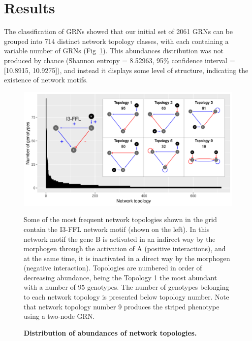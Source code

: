 \documentclass[10pt,letterpaper]{article}
\begin{document}


\section*{Results}

The classification of GRNs showed that our initial set of 2061 GRNs can be
grouped into 714 distinct network topology classes, with each containing a
variable number of GRNs (Fig~\ref{fig:distopol}). This abundances
distribution was not produced by chance (Shannon entropy = 8.52963, 95\%
confidence interval = [10.8915, 10.9275]), and instead it displays some level
of structure, indicating the existence of network motifs.

\begin{figure}[!h]
 \includegraphics[width=\textwidth]{figures/results/Fig2}
 \caption{\bf Distribution of abundances of network topologies.}
 Some of the most frequent network topologies shown in the grid
 contain the I3-FFL network motif (shown on the left). In this network
 motif the gene B is activated in an indirect way by the morphogen through
 the activation of A (positive interactions), and at the same time, it
 is inactivated in a direct way by the morphogen (negative interaction).
 Topologies are numbered in order of decreasing abundance, being the
 Topology 1 the most abundant with a number of 95 genotypes. The number of
 genotypes belonging to each network topology is presented below
 topology number.
 Note that network topology number 9 produces the striped phenotype using a
 two-node GRN.
 \label{fig:distopol}
\end{figure}
\end{document}
